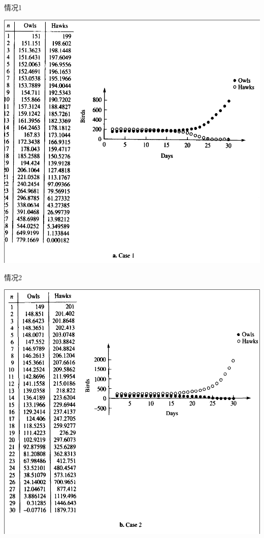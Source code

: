\documentclass{beamer}
\begin{document}
\begin{frame}{情况1}
  \begin{center}
    \includegraphics[height=.9\textheight{}]{owl-1.png}
  \end{center}  
\end{frame}

\begin{frame}{情况2}
  \begin{center}
    \includegraphics[height=.9\textheight{}]{owl-2.png}
  \end{center}  
\end{frame}
\end{document}
